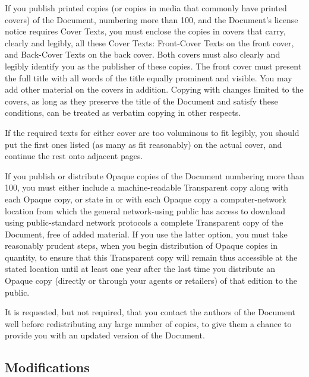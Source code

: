 {\tiny{}If you publish printed copies (or copies in media that commonly
have printed covers) of the Document, numbering more than 100, and
the Document\textsf{'}s license notice requires Cover Texts, you must enclose
the copies in covers that carry, clearly and legibly, all these Cover
Texts: Front-Cover Texts on the front cover, and Back-Cover Texts
on the back cover. Both covers must also clearly and legibly identify
you as the publisher of these copies. The front cover must present
the full title with all words of the title equally prominent and visible.
You may add other material on the covers in addition. Copying with
changes limited to the covers, as long as they preserve the title
of the Document and satisfy these conditions, can be treated as verbatim
copying in other respects.}{\tiny\par}

{\tiny{}If the required texts for either cover are too voluminous
to fit legibly, you should put the first ones listed (as many as fit
reasonably) on the actual cover, and continue the rest onto adjacent
pages.}{\tiny\par}

{\tiny{}If you publish or distribute Opaque copies of the Document
numbering more than 100, you must either include a machine-readable
Transparent copy along with each Opaque copy, or state in or with
each Opaque copy a computer-network location from which the general
network-using public has access to download using public-standard
network protocols a complete Transparent copy of the Document, free
of added material. If you use the latter option, you must take reasonably
prudent steps, when you begin distribution of Opaque copies in quantity,
to ensure that this Transparent copy will remain thus accessible at
the stated location until at least one year after the last time you
distribute an Opaque copy (directly or through your agents or retailers)
of that edition to the public.}{\tiny\par}

{\tiny{}It is requested, but not required, that you contact the authors
of the Document well before redistributing any large number of copies,
to give them a chance to provide you with an updated version of the
Document.}{\tiny\par}

\subsection{Modifications\label{subsec:4Modifications}}

